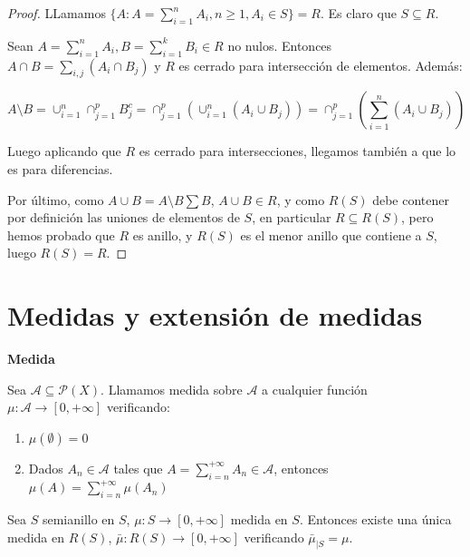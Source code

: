 \begin{proof}
 LLamamos $\{A: A=\sum_{i=1}^n A_i, n\ge 1, A_i \in S\} = R$. Es claro que $S\subseteq R$.
 
 Sean $A = \sum_{i=1}^n A_i, B = \sum_{i=1}^k B_i \in R$ no nulos. Entonces $A\cap B = \sum_{i,j} (A_i \cap B_j)$ y $R$
 es cerrado para intersección de elementos. Además:
 
 \[A\setminus B = \cup_{i=1}^n \cap_{j=1}^p B_j^c = \cap_{j=1}^p \left(\cup_{i=1}^n (A_i \cup B_j)\right) = \cap_{j=1}^p \left(\sum_{i=1}^n (A_i \cup B_j)\right)\]
 
 Luego aplicando que $R$ es cerrado para intersecciones, llegamos también a que lo es para diferencias.
 
 Por último, como $A\cup B = A \setminus B \sum B$, $A \cup B \in R$, y como $R(S)$ debe contener por definición
 las uniones de elementos de $S$, en particular $R\subseteq R(S)$, pero hemos probado que $R$ es anillo, y $R(S)$
 es el menor anillo que contiene a $S$, luego $R(S) = R$.
\end{proof}


\section{Medidas y extensión de medidas}

\begin{definition} \textbf{Medida}

 Sea $\mathcal{A} \subseteq \mathcal{P}(X)$. Llamamos medida sobre $\mathcal{A}$ a cualquier función 
 $\mu: \mathcal{A} \rightarrow [0, +\infty]$ verificando:

 \begin{enumerate}[i]
  \item $\mu(\emptyset) = 0$
  \item Dados $A_n \in \mathcal{A}$ tales que $A = \sum_{i=n}^{+\infty} A_n \in \mathcal{A}$, entonces 
  $\mu(A)= \sum_{i=n}^{+\infty} \mu(A_n)$
 \end{enumerate}
\end{definition}


\begin{theorem}
 Sea $S$ semianillo en $S$, $\mu: S \rightarrow [0,+\infty]$ medida en $S$. Entonces existe una única medida 
 en $R(S)$, $\bar{\mu}: R(S) \rightarrow [0,+\infty]$ verificando $\bar{\mu}_{|S} = \mu$.
\end{theorem}

